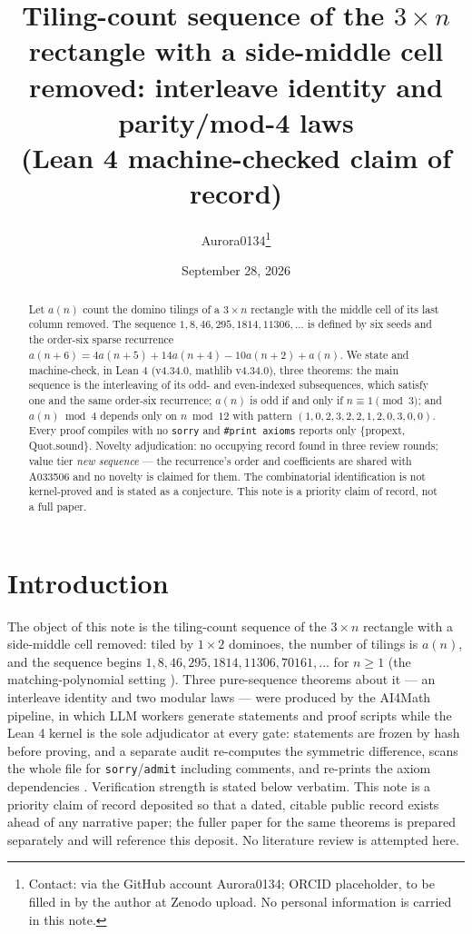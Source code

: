 \documentclass[11pt]{article}
\title{Tiling-count sequence of the $3\times n$ rectangle with a side-middle
cell removed: interleave identity and parity/mod-4 laws\\ (Lean 4
machine-checked claim of record)}
\author{Aurora0134\thanks{Contact: via the GitHub account Aurora0134; ORCID
placeholder, to be filled in by the author at Zenodo upload. No personal
information is carried in this note.}}
\date{September 28, 2026}
\theoremstyle{definition}
\begin{document}
\maketitle

\begin{abstract}
Let $a(n)$ count the domino tilings of a $3\times n$ rectangle with the
middle cell of its last column removed. The sequence
$1,8,46,295,1814,11306,\dots$ is defined by six seeds and the order-six sparse
recurrence $a(n+6)=4a(n+5)+14a(n+4)-10a(n+2)+a(n)$. We state and
machine-check, in Lean 4 (v4.34.0, mathlib v4.34.0), three theorems: the main
sequence is the interleaving of its odd- and even-indexed subsequences, which
satisfy one and the same order-six recurrence; $a(n)$ is odd if and only if
$n\equiv 1\pmod 3$; and $a(n)\bmod 4$ depends only on $n\bmod 12$ with
pattern $(1,0,2,3,2,2,1,2,0,3,0,0)$. Every proof compiles with no
\texttt{sorry} and \texttt{\#print axioms} reports only \{propext,
Quot.sound\}. Novelty adjudication: no occupying record found in three review
rounds; value tier \emph{new sequence} --- the recurrence's order and
coefficients are shared with A033506 and no novelty is claimed for them. The
combinatorial identification is not kernel-proved and is stated as a
conjecture. This note is a priority claim of record, not a full paper.
\end{abstract}

\section{Introduction}

The object of this note is the tiling-count sequence of the $3\times n$
rectangle with a side-middle cell removed: tiled by $1\times 2$ dominoes, the
number of tilings is $a(n)$, and the sequence begins
$1,8,46,295,1814,11306,70161,\dots$ for $n\ge 1$ (the matching-polynomial
setting \cite{godsil-gutman}). Three pure-sequence theorems about it --- an
interleave identity and two modular laws --- were produced by the AI4Math
pipeline, in which LLM workers generate statements and proof scripts while the
Lean 4 kernel is the sole adjudicator at every gate: statements are frozen by
hash before proving, and a separate audit re-computes the symmetric
difference, scans the whole file for \texttt{sorry}/\texttt{admit} including
comments, and re-prints the axiom dependencies \cite{lean4,mathlib}.
Verification strength is stated below verbatim. This note is a priority claim
of record deposited so that a dated, citable public record exists ahead of any
narrative paper; the fuller paper for the same theorems is prepared separately
and will reference this deposit. No literature review is attempted here.
\end{document}

